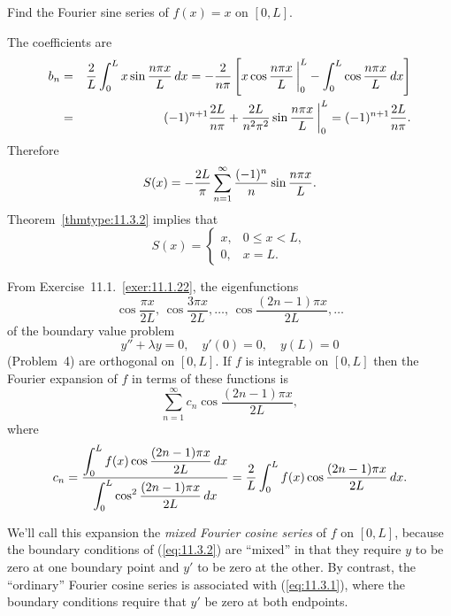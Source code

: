 \begin{example}
  \label{example:11.3.2} \rm Find the Fourier sine series of $f(x)=x$ on $[0,L]$.
\end{example}

\begin{examplesolution}
\solution The coefficients are
\begin{eqnarray*}
  b_{n} & = & \frac{2}{L}\int_{0}^{L}x\sin\frac{n\pi x}{L}\,dx=-\frac{2}{n\pi}\left[x\cos\frac{n\pi x}{L}\,\bigg|_{0}^{L}-\int_{0}^{L}\cos\frac{n\pi x}{L}\,dx\right] \\
        & = & (-1)^{n+1}\frac{2L}{n\pi}+\frac{2L}{n^{2}\pi^{2}}\sin\frac{n\pi x}{L}\,\bigg|_{0}^{L}=(-1)^{n+1}\frac{2L}{n\pi}.
\end{eqnarray*}
Therefore
\[
  S(x)=\displaystyle-\frac{2L}{\pi}\sum_{n=1}^{\infty}\frac{(-1)^{n}}{n}\sin\frac{n\pi x}{L}.
\]
Theorem~\ref{thmtype:11.3.2} implies that
\[
  S(x)= \left\{
  \begin{array}{cl}
    x, & 0\le x<L, \\
    0, & x=L.
  \end{array}\right.
\]
\end{examplesolution}


\noindent
From Exercise~11.1.~\hspace*{-3pt}\ref{exer:11.1.22}, the eigenfunctions
\[
  \cos\frac{\pi x}{2L}, \,\cos\frac{3\pi x}{2L},\dots, \,\cos\frac{(2n-1)\pi x}{2L},\dots
\]
of the boundary value problem
\begin{equation}
  \label{eq:11.3.2}y''+\lambda y=0,\quad y'(0)=0,\quad y(L)=0
\end{equation}
(Problem~4) are orthogonal on $[0,L]$. If $f$ is integrable on $[0,L]$ then the Fourier expansion of
$f$ in terms of these functions is
\[
  \sum_{n=1}^{\infty}c_{n}\cos\frac{(2n-1)\pi x}{2L},
\]
where
\[
  c_{n}=\frac{\displaystyle\int_{0}^{L}f(x)\cos\frac{(2n-1)\pi x}{2L}\,dx}{\displaystyle\int_{0}^{L}\cos^{2}\frac{(2n-1)\pi x}{2L}\,dx}=\frac{2}{L}\int_{0}^{L}f(x)\cos\frac{(2n-1)\pi x}{2L}\,dx.
\]

We'll call this expansion the {\color{blue}\it mixed Fourier cosine series\/} of $f$ on $[0,L]$,
because the boundary conditions of (\ref{eq:11.3.2}) are ``mixed'' in that they require $y$ to be
zero at one boundary point and $y'$ to be zero at the other. By contrast, the ``ordinary'' Fourier
cosine series is associated with (\ref{eq:11.3.1}), where the boundary conditions require that $y'$
be zero at both endpoints.

